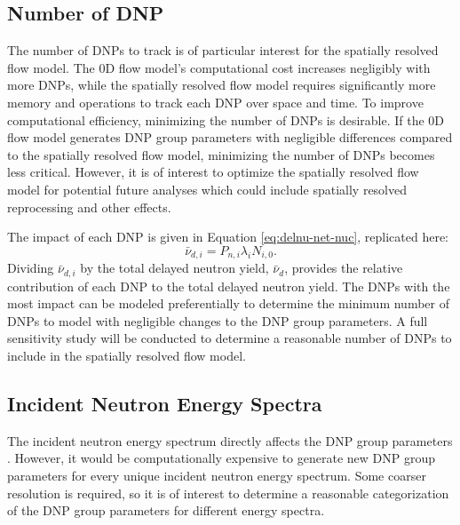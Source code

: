 \subsection{Number of DNP}
The number of \glspl{DNP} to track is of particular interest for the spatially resolved flow model.
The 0D flow model's computational cost increases negligibly with more \glspl{DNP}, while the spatially resolved flow model requires significantly more memory and operations to track each \gls{DNP} over space and time.
To improve computational efficiency, minimizing the number of \glspl{DNP} is desirable.
If the 0D flow model generates \gls{DNP} group parameters with negligible differences compared to the spatially resolved flow model, minimizing the number of \glspl{DNP} becomes less critical.
However, it is of interest to optimize the spatially resolved flow model for potential future analyses which could include spatially resolved reprocessing and other effects.

The impact of each \gls{DNP} is given in Equation \eqref{eq:delnu-net-nuc}, replicated here:
\begin{equation}
    \bar{\nu}_{d, i} = P_{n, i} \lambda_i N_{i, 0}.
    \nonumber
\end{equation}
Dividing $\bar{\nu}_{d, i}$ by the total delayed neutron yield, $\bar{\nu}_d$, provides the relative contribution of each \gls{DNP} to the total delayed neutron yield.
The \glspl{DNP} with the most impact can be modeled preferentially to determine the minimum number of \glspl{DNP} to model with negligible changes to the \gls{DNP} group parameters.
A full sensitivity study will be conducted to determine a reasonable number of \glspl{DNP} to include in the spatially resolved flow model.



\subsection{Incident Neutron Energy Spectra}
\label{sec:indidentspectra}
The incident neutron energy spectrum directly affects the \gls{DNP} group parameters \cite{brady1989delayed}.
However, it would be computationally expensive to generate new \gls{DNP} group parameters for every unique incident neutron energy spectrum.
Some coarser resolution is required, so it is of interest to determine a reasonable categorization of the \gls{DNP} group parameters for different energy spectra.

